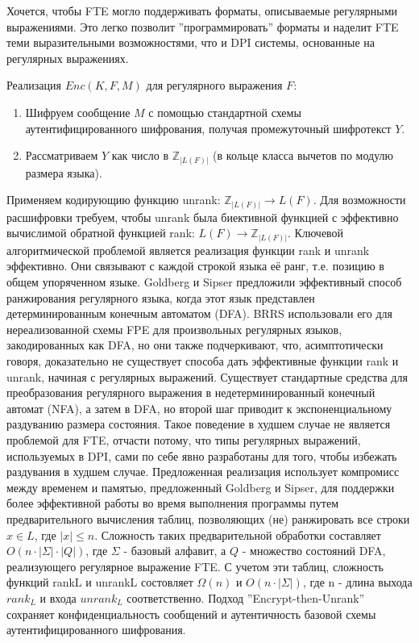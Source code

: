 Хочется, чтобы FTE могло поддерживать форматы, описываемые регулярными выражениями.
Это легко позволит ''программировать'' форматы и наделит FTE теми выразительными возможностями, что и DPI системы, основанные на регулярных выражениях.

Реализация $Enc(K, F, M)$ для регулярного выражения $F$:
\begin{enumerate}
    \item Шифруем сообщение $M$ с помощью стандартной схемы аутентифицированного шифрования, получая промежуточный шифротекст $Y$.
    \item Рассматриваем $Y$ как число в $\mathbb{Z}_{|L(F)|}$ (в кольце класса вычетов по модулю размера языка).
\end{enumerate}


Применяем кодирующию функцию unrank: $\mathbb{Z}_{|L(F)|} \rightarrow L(F)$.
Для возможности расшифровки требуем, чтобы unrank была биективной функцией с эффективно вычислимой обратной функцией rank:  $L(F) \rightarrow \mathbb{Z}_{|L(F)|}$.
Ключевой алгоритмической проблемой является реализация функции rank и unrank эффективно.
Они связывают с каждой строкой языка её ранг, т.е. позицию в общем упоряченном языке.
Goldberg и Sipser предложили эффективный способ ранжирования регулярного языка, когда этот язык представлен детерминированным конечным автоматом (DFA).
BRRS использовали его для нереализованной схемы FPE для произвольных регулярных языков, закодированных как DFA, но они также подчеркивают,
что, асимптотически говоря, доказательно не существует способа дать эффективные функции rank и unrank, начиная с регулярных выражений.
Существует стандартные средства для преобразования регулярного выражения в недетерминированный конечный автомат (NFA),
а затем в DFA, но второй шаг приводит к экспоненциальному раздуванию размера состояния.
Такое поведение в худшем случае не является проблемой для FTE, отчасти потому,
что типы регулярных выражений, используемых в DPI, сами по себе явно разработаны для того, чтобы избежать раздувания в худшем случае.
Предложенная реализация использует компромисс между временем и памятью, предложенный Goldberg и Sipser,
для поддержки более эффективной работы во время выполнения программы путем предварительного вычисления таблиц,
позволяющих (не) ранжировать все строки $x \in L$, где $|x| \leq n$. Сложность таких предварительной обработки составляет $O(n \cdot |\Sigma| \cdot |Q|)$,
где $\Sigma$ - базовый алфавит, а $Q$ - множество состояний DFA, реализующего регулярное выражение FTE.
С учетом эти таблиц, сложность функций rankL и unrankL состовляет $\Omega(n)$ и $O(n · |\Sigma|)$, где n - длина выхода $rank_{L}$ и входа $unrank_{L}$ соответственно.
Подход ''Encrypt-then-Unrank'' сохраняет конфиденциальность сообщений и аутентичность базовой схемы аутентифицированного шифрования.



